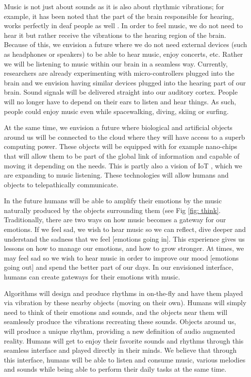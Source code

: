 \documentclass[sigchi]{acmart}
\begin{document}
Music is not just about sounds as it is also about rhythmic vibrations; for example, it has been noted that the part of the brain responsible for hearing, works perfectly in deaf people as well \cite{abcsciencemusic}. In order to feel music, we do not need to hear it but rather receive the vibrations to the hearing region of the brain. Because of this, we envision a future where we do not need external devices (such as headphones or speakers) to be able to hear music, enjoy concerts, etc. Rather we will be listening to music within our brain in a seamless way. Currently, researchers are already experimenting with micro-controllers plugged into the brain and we envision having similar devices plugged into the hearing part of our brain. Sound signals will be delivered straight into our auditory cortex. People will no longer have to depend on their ears to listen and hear things. As such, people could enjoy music even while spacewalking, diving, skiing or surfing. %

At the same time, we envision a future where biological and artificial objects around us will be connected to the cloud \cite{musk2019integrated} where they will have access to a superb computing power. These objects will be equipped with for example nano-chips that will allow them to be part of the global link of information and capable of moving it depending on the needs. This is partly also a vision of IoT \cite{weisman2004internet}, which we are expanding to music listening. These technologies will allow humans and objects to telepathically communicate.  

In the future humans will be able to amplify their emotions by the music naturally produced by the objects surrounding them (see Fig \ref{fig: think}. Traditionally, there are two ways on how music becomes a gateway for our emotions. If we feel sad, we wish to hear music so we can reflect, dive deeper and understand the sadness that we feel [emotions going in]. This experience gives us lessons on how to manage our emotions, and how to grow stronger. At times, we may feel sad so we wish to hear music in order to improve our mood [emotions going out] and spend the better part of our days. In our envisioned interface, humans can create gateways for their emotions with music.

Algorithms will design and produce rhythms in on-the-fly and have them played via vibration by these nearby objects (moving on their own). Humans will simply need to think of their emotions and sounds, and the objects near them will seamlessly produce the vibrations recreating these sounds. Objects around us, will produce a unique rhythm, providing a new definition of audio augmented reality. Humans will get to enjoy their favorite sounds and rhythms through this seamless interface and played directly in their minds. We believe that through this interface, humans will be able to listen and consume music, various melodies and sounds while being able to perform their daily tasks at the same time. 
\end{document}
